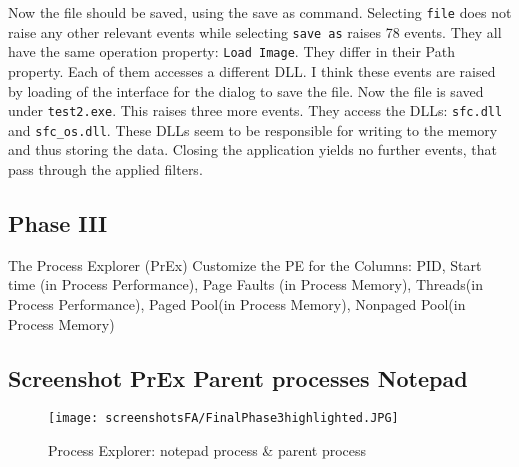 \documentclass{Gharaei}
\begin{document}
Now the file should be saved, using the save as command. 
Selecting \texttt{file} does not raise any other relevant events while 
selecting \texttt{save as} raises 78 events. They all have the same operation property: \texttt{Load Image}. They differ in their Path property. Each of them accesses a different DLL.
I think these events are raised by loading of the interface for the dialog to save the file.
Now the file is saved under \texttt{test2.exe}. This raises three more events. They access the DLLs: \texttt{sfc.dll} and \texttt{sfc\_os.dll}. These DLLs seem to be responsible for writing to the memory and thus storing the data.
Closing the application yields no further events, that pass through the applied filters.

\subsection{Phase III}
The Process Explorer (PrEx)
Customize the PE for the Columns:  PID, Start time (in Process Performance), Page Faults (in Process Memory), Threads(in Process Performance), Paged Pool(in Process Memory), Nonpaged Pool(in Process Memory)
\subsection*{Screenshot PrEx Parent processes Notepad}
\begin{figure}
    \centering
        \texttt{[image: screenshotsFA/FinalPhase3highlighted.JPG]}
        \caption{Process Explorer: notepad process \& parent process}
\end{figure}
\end{document}
